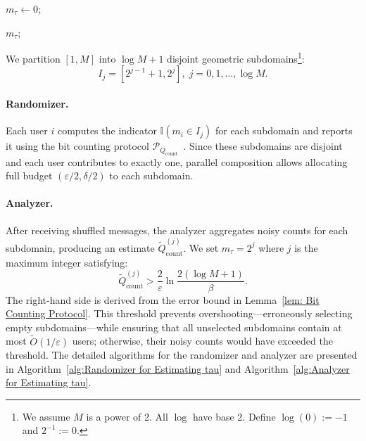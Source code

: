\begin{algorithm}[t]
\caption{Analyzer for Estimating $m_\tau$} 
\label{alg:Analyzer for Estimating tau}


$m_\tau \leftarrow 0$;


\Return $m_\tau$;
\end{algorithm}

We partition $[1, M]$ into $\log M +1$ disjoint geometric subdomains\footnote{We assume $M$ is a power of 2. All $\log$ have base 2. Define $\log (0) := -1$ and $2^{-1}:= 0.$}:
$$I_j = [2^{j-1}+1, 2^j],\;j = 0,1,\dots,\log M.$$

\paragraph{Randomizer.} Each user $i$ computes the indicator $\mathbb{I}(m_i \in I_j)$ for each subdomain and reports it using the bit counting protocol $\mathcal{P}_{Q_\text{count}}$~\cite{ghazi2021differentially}. 
Since these subdomains are disjoint and each user contributes to exactly one, parallel composition allows allocating full budget $(\varepsilon/2, \delta/2)$ to each subdomain.

\paragraph{Analyzer.} After receiving shuffled messages, the analyzer aggregates noisy counts for each subdomain, producing an estimate $\tilde{Q}^{(j)}_\text{count}$. 
We set $m_\tau = 2^j$ where $j$ is the maximum integer satisfying:
$$\tilde{Q}_\text{count}^{(j)} > \frac{2}{\varepsilon}\ln\frac{2(\log M+1)}{\beta}.$$
The right-hand side is derived from the error bound in Lemma~\ref{lem: Bit Counting Protocol}.
This threshold prevents overshooting---erroneously selecting empty subdomains---while ensuring that all unselected subdomains contain at most $\tilde{O}(1/\varepsilon)$ users; otherwise, their noisy counts would have exceeded the threshold.
The detailed algorithms for the randomizer and analyzer are presented in Algorithm~\ref{alg:Randomizer for Estimating tau} and Algorithm~\ref{alg:Analyzer for Estimating tau}.

